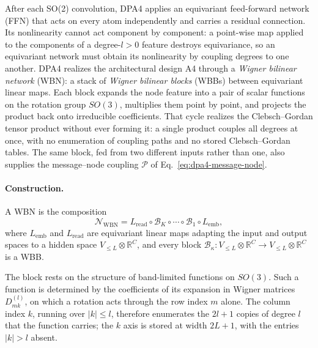 After each SO(2) convolution, DPA4 applies an equivariant feed-forward network (FFN) that acts on every atom independently and carries a residual connection.
Its nonlinearity cannot act component by component: a point-wise map applied to the components of a degree-$l>0$ feature destroys equivariance, so an equivariant network must obtain its nonlinearity by coupling degrees to one another.
DPA4 realizes the architectural design A4 through a \emph{Wigner bilinear network} (WBN): a stack of \emph{Wigner bilinear blocks} (WBBs) between equivariant linear maps.
Each block expands the node feature into a pair of scalar functions on the rotation group $SO(3)$, multiplies them point by point, and projects the product back onto irreducible coefficients.
That cycle realizes the Clebsch--Gordan tensor product without ever forming it: a single product couples all degrees at once, with no enumeration of coupling paths and no stored Clebsch--Gordan tables.
The same block, fed from two different inputs rather than one, also supplies the message--node coupling $\mathcal{P}$ of Eq.~\eqref{eq:dpa4-message-node}.

\paragraph{Construction.}
A WBN is the composition
\begin{equation}
    \mathcal{N}_{\mathrm{WBN}}
    = L_{\mathrm{read}}\circ\mathcal{B}_{K}\circ\cdots\circ\mathcal{B}_{1}\circ L_{\mathrm{emb}} ,
    \label{eq:dpa4-wbn}
\end{equation}
where $L_{\mathrm{emb}}$ and $L_{\mathrm{read}}$ are equivariant linear maps adapting the input and output spaces to a hidden space $V_{\le L}\otimes\mathbb{R}^{C}$, and every block $\mathcal{B}_{\kappa}:V_{\le L}\otimes\mathbb{R}^{C}\to V_{\le L}\otimes\mathbb{R}^{C}$ is a WBB.

The block rests on the structure of band-limited functions on $SO(3)$.
Such a function is determined by the coefficients of its expansion in Wigner matrices $D^{(l)}_{mk}$, on which a rotation acts through the row index $m$ alone.
The column index $k$, running over $|k|\le l$, therefore enumerates the $2l+1$ copies of degree $l$ that the function carries; the $k$ axis is stored at width $2L+1$, with the entries $|k|>l$ absent.

